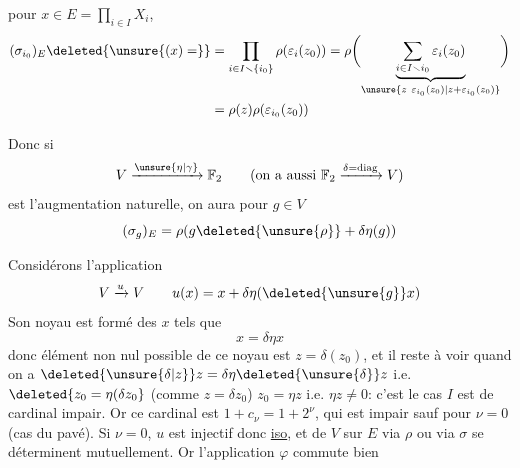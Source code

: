 pour $x\in E=\prod_{i\in I} X_i$, 
\[
\begin{aligned}
(\sigma_{i_0})_E\deleted{\unsure{(x)=}}&=\prod_{i\in I\smallsetminus\{i_0\}}\rho(\varepsilon_i(z_0))
=\rho\biggl(\underbrace{\sum_{i\in I\smallsetminus i_0}\varepsilon_i(z_0)}_{\unsure{z\ \varepsilon_{i_0}(z_0)|z+\varepsilon_{i_0}(z_0)}}\biggr)\\
&=\rho(z)\rho(\varepsilon_{i_0}(z_0))
\end{aligned}
\]

Donc si
\[
V\xrightarrow{\unsure{\eta|\gamma}}\mathbb F_2\qquad
(\text{on a aussi }\mathbb F_2\xrightarrow{\delta=\mathrm{diag}}V)
\]
est l'augmentation naturelle, on aura pour $g\in V$
\[
(\sigma_g)_E=\rho(g\deleted{\unsure{\rho}}+\delta\eta(g))
\]

Considérons l'application
\[
V\xrightarrow{u}V\qquad u(x)=x+\delta\eta(\deleted{\unsure{g}}x)
\]
Son noyau est formé des $x$ tels que
\[
x=\delta\eta x
\]
donc  élément non nul possible de ce noyau est $z=\delta(z_0)$, et il reste à voir quand on a $\deleted{\unsure{\delta|z}}z=\delta\eta\deleted{\unsure{\delta}}z$ i.e. $\deleted{z_0=\eta(\delta z_0}$ (comme $z=\delta z_0$) $z_0=\eta z$ i.e. $\eta z\ne0$: c'est le cas  $I$ est de cardinal impair. Or ce cardinal est $1+c_\nu=1+2^\nu$, qui est impair sauf pour $\nu=0$ (cas du pavé).    Si $\nu=0$, $u$ est injectif donc \uline{iso}, et  de $V$ sur $E$ via $\rho$ ou via $\sigma$ se déterminent mutuellement. Or l'application $\varphi$ commute bien
